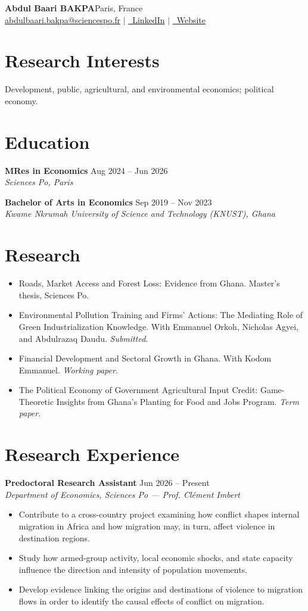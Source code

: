 \documentclass[11pt,a4paper]{article}
\newcommand{\role}[3]{%
  \textbf{#1} \hfill #2\\[-1pt]
  \textit{#3}\par\vspace{0.45ex}
}
\begin{document}
{\LARGE\textbf{Abdul Baari BAKPA}}\hfill Paris, France\\[1pt]
\href{mailto:abdulbaari.bakpa@sciencespo.fr}{abdulbaari.bakpa@sciencespo.fr}
\quad $\vert$ \quad
\href{https://www.linkedin.com/in/abdul-baari-bakpa/}{\faLinkedin\ LinkedIn}
\quad $\vert$ \quad
\href{https://abdulbaaribakpa.github.io}{\faGlobe\ Website}

\section*{Research Interests}
Development, public, agricultural, and environmental economics; political economy.

\section*{Education}
\role{MRes in Economics}{Aug 2024 -- Jun 2026}{Sciences Po, Paris}
\role{Bachelor of Arts in Economics}{Sep 2019 -- Nov 2023}{Kwame Nkrumah University of Science and Technology (KNUST), Ghana}

\section*{Research}
\begin{itemize}
  \item Roads, Market Access and Forest Loss: Evidence from Ghana. Master's thesis, Sciences Po.
  \item Environmental Pollution Training and Firms' Actions: The Mediating Role of Green Industrialization Knowledge. With Emmanuel Orkoh, Nicholas Agyei, and Abdulrazaq Daudu. \textit{Submitted}.
  \item Financial Development and Sectoral Growth in Ghana. With Kodom Emmanuel. \textit{Working paper}.
  \item The Political Economy of Government Agricultural Input Credit: Game-Theoretic Insights from Ghana's Planting for Food and Jobs Program. \textit{Term paper}.
\end{itemize}

\section*{Research Experience}
\role{Predoctoral Research Assistant}{Jun 2026 -- Present}{Department of Economics, Sciences Po --- Prof. Cl\'ement Imbert}
\begin{itemize}
  \item Contribute to a cross-country project examining how conflict shapes internal migration in Africa and how migration may, in turn, affect violence in destination regions.
  \item Study how armed-group activity, local economic shocks, and state capacity influence the direction and intensity of population movements.
  \item Develop evidence linking the origins and destinations of violence to migration flows in order to identify the causal effects of conflict on migration.
\end{itemize}
\end{document}
